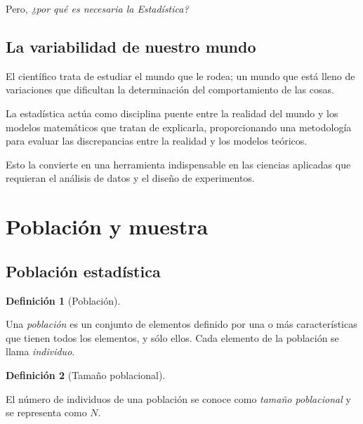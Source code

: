 \documentclass[
  a4paper,
]{scrreport}
\theoremstyle{definition}
\newtheorem{definition}{Definición}[chapter]
\theoremstyle{definition}
\theoremstyle{plain}
\theoremstyle{remark}
\begin{document}
Pero, \emph{¿por qué es necesaria la Estadística?}

\hypertarget{la-variabilidad-de-nuestro-mundo}{%
\subsection{La variabilidad de nuestro
mundo}\label{la-variabilidad-de-nuestro-mundo}}

El científico trata de estudiar el mundo que le rodea; un mundo que está
lleno de variaciones que dificultan la determinación del comportamiento
de las cosas.

La estadística actúa como disciplina puente entre la realidad del mundo
y los modelos matemáticos que tratan de explicarla, proporcionando una
metodología para evaluar las discrepancias entre la realidad y los
modelos teóricos.

Esto la convierte en una herramienta indispensable en las ciencias
aplicadas que requieran el análisis de datos y el diseño de
experimentos.

\hypertarget{poblaciuxf3n-y-muestra}{%
\section{Población y muestra}\label{poblaciuxf3n-y-muestra}}

\hypertarget{poblaciuxf3n-estaduxedstica}{%
\subsection{Población estadística}\label{poblaciuxf3n-estaduxedstica}}

\leavevmode{}%
\begin{definition}[Población]\label{def-poblacion}

Una \emph{población} es un conjunto de elementos definido por una o más
características que tienen todos los elementos, y sólo ellos. Cada
elemento de la población se llama \emph{individuo}.

\end{definition}

\leavevmode{}%
\begin{definition}[Tamaño poblacional]\label{def-tamaño-poblacional}

El número de individuos de una población se conoce como \emph{tamaño
poblacional} y se representa como \(N\).

\end{definition}
\end{document}
